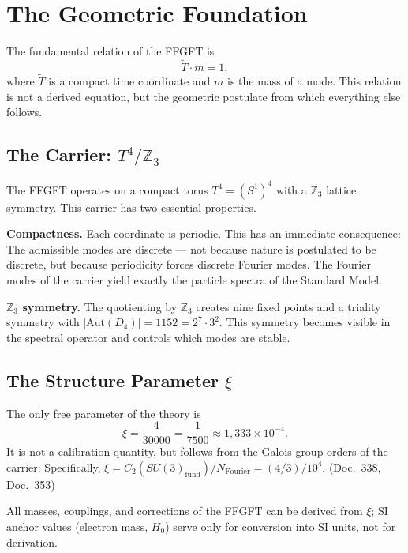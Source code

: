 \chapter{The Geometric Foundation}
\label{ch:grundlage}

The fundamental relation of the FFGFT is
\begin{equation}
  \tilde T \cdot m = 1,
  \label{eq:tm}
\end{equation}
where $\tilde T$ is a compact time coordinate and $m$ is the mass of a
mode. This relation is not a derived
equation, but the geometric postulate from which everything else
follows.

\section{The Carrier: $T^4/\mathbb{Z}_3$}

The FFGFT operates on a compact torus $T^4 = (S^1)^4$ with a
$\mathbb{Z}_3$ lattice symmetry. This carrier has two essential
properties.

\textbf{Compactness.} Each coordinate is periodic. This has an
immediate consequence: The admissible modes are discrete — not because
nature is postulated to be discrete, but because periodicity
forces discrete Fourier modes. The Fourier modes of the carrier yield
exactly the particle spectra of the Standard Model.

\textbf{$\mathbb{Z}_3$ symmetry.} The quotienting by
$\mathbb{Z}_3$ creates nine fixed points and a triality symmetry with
$|\mathrm{Aut}(D_4)| = 1152 = 2^7\cdot3^2$. This symmetry becomes
visible in the spectral operator and controls which modes are stable.

\section{The Structure Parameter $\xi$}

The only free parameter of the theory is
\begin{equation}
  \xi = \frac{4}{30000} = \frac{1}{7500} \approx 1{,}333\times10^{-4}.
\end{equation}
It is not a calibration quantity, but follows from the
Galois group orders of the carrier: Specifically,
$\xi = C_2(SU(3)_{\mathrm{fund}})/N_{\mathrm{Fourier}}= (4/3)/10^4$.
(Doc.~338, Doc.~353)

All masses, couplings, and corrections of the FFGFT can be derived from $\xi$;
SI anchor values (electron mass, $H_0$) serve only for
conversion into SI units, not for derivation.

